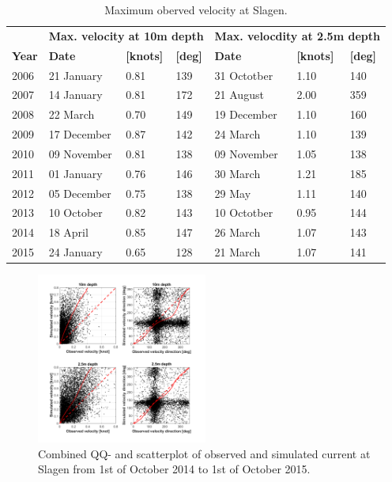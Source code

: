 \documentclass[12pt,a4paper,english]{article}
\begin{document}
\begin{table}[ht]
\caption{Maximum oberved velocity at Slagen.}
\label{tab:Slagen_max}
\centering
\begin{tabular}{|l|lll|lll|}
\hline 
& \multicolumn{3}{|l|}{\bf Max. velocity at 10m depth} & \multicolumn{3}{|l|}{\bf Max. velocdity at 2.5m depth} \\
{\bf Year} & {\bf Date} & {\bf [knots]} & {\bf [deg]} & {\bf Date} & {\bf [knots]} & {\bf [deg]} \\ \hline 
\small 2006 & 21 January  & 0.81 & 139 & 31 Octotber & 1.10 & 140 \\
\small 2007 & 14 January  & 0.81 & 172 & 21 August   & 2.00 & 359 \\
\small 2008 & 22 March    & 0.70 & 149 & 19 December & 1.10 & 160 \\
\small 2009 & 17 December & 0.87 & 142 & 24 March    & 1.10 & 139 \\
\small 2010 & 09 November & 0.81 & 138 & 09 November & 1.05 & 138 \\
\small 2011 & 01 January  & 0.76 & 146 & 30 March    & 1.21 & 185 \\
\small 2012 & 05 December & 0.75 & 138 & 29 May      & 1.11 & 140 \\
\small 2013 & 10 October  & 0.82 & 143 & 10 Octotber & 0.95 & 144 \\
\small 2014 & 18 April    & 0.85 & 147 & 26 March    & 1.07 & 143 \\
\small 2015 & 24 January  & 0.65 & 128 & 21 March    & 1.07 & 141 \\
\hline
\end{tabular}
\end{table}

\begin{figure}[ht]
\centerline{
\includegraphics*[trim=0cm 0cm 0cm 0cm,clip=true,width=0.5\textwidth]{Figurer/Slagen_QQ}}
\caption{\small
Combined QQ- and scatterplot of observed and simulated current at Slagen from 1st of October 2014 to 1st of October 2015.}
\label{fig:Slagen_QQ}
\end{figure}
\end{document}
